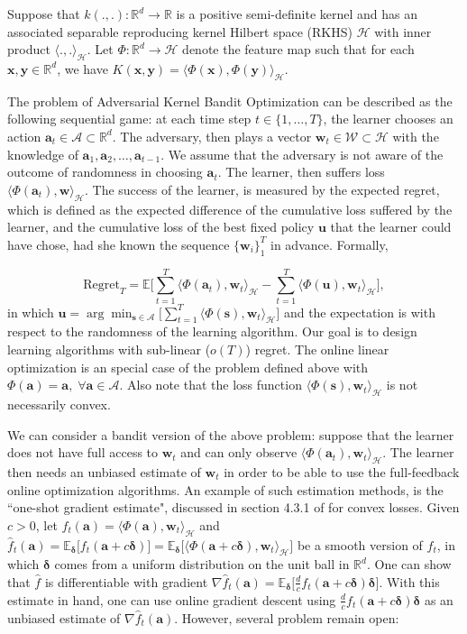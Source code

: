 \documentclass[]{article}
\newcommand{\s}{\mathbf{s}}
\newcommand{\ba}{\mathbf{a}}
\newcommand{\bw}{\mathbf{w}}
\newcommand{\cA}{\mathcal{A}}
\newcommand{\cW}{\mathcal{W}}
\newcommand{\cH}{\mathcal{H}}
\newcommand{\R}{\mathbb{R}}
\begin{document}
Suppose that $k(., .): \R^d \to \R$ is a positive semi-definite kernel and has an associated separable reproducing kernel Hilbert space (RKHS) $\cH$ with inner product $\langle ., .\rangle_\cH$. Let $\Phi: \R^d \to \cH$ denote the feature map such that for each $\mathbf{x}, \mathbf{y} \in \R^d$, we have
$K(\mathbf{x}, \mathbf{y}) = \langle \Phi(\mathbf{x}), \Phi(\mathbf{y}) \rangle_\cH $.


The problem of Adversarial Kernel Bandit Optimization can be described as the following sequential game: at each time step $t \in \{1, \dots, T\}$, the learner chooses an action $\ba_t \in \cA \subset \R^d$. The adversary, then plays a vector $\bw_t \in \cW \subset \cH$ with the knowledge of $\ba_1, \ba_2, \dots, \ba_{t-1}$. We assume that the adversary is not aware of the outcome of randomness in choosing $\ba_t$. The learner, then suffers loss $\langle \Phi(\ba_t), \bw\rangle_\cH$.  The success of the learner, is measured by the expected regret, which is defined as the expected difference of the cumulative loss suffered by the learner, and the cumulative loss of the best fixed policy $\mathbf{u}$ that the learner could have chose, had she known the sequence  $\{\bw_i\}_{1}^{T}$ in advance. Formally, 

$$\mathrm{Regret}_T = \mathbb{E}\Big[\sum_{t = 1}^{T}\langle \Phi(\ba_t), \bw_t\rangle_\cH - \sum_{t = 1}^{T}\langle \Phi(\mathbf{u}), \bw_t\rangle_\cH\Big],$$
in which $\mathbf{u} = \arg\min_{\s\in\cA} \Big[\sum_{t = 1}^{T}\langle \Phi(\s), \bw_t\rangle_\cH\Big]$ and the expectation is with respect to the randomness of the learning algorithm. Our goal is to design learning algorithms with sub-linear ($o(T)$) regret. The online linear optimization is an special case of the problem defined above with $\Phi(\ba) = \ba, \; \forall \ba \in \cA$. Also note that the loss function $\langle \Phi(\s), \bw_t\rangle_\cH$ is not necessarily convex.


We can consider a bandit version of the above problem: suppose that the learner does not have full access to $\bw_t$ and can only observe $\langle \Phi(\ba_t), \bw_t\rangle_\cH$. The learner then needs an unbiased estimate of $\bw_t$ in order to be able to use the full-feedback online optimization algorithms. An example of such estimation methods, is the ``one-shot gradient estimate", discussed in section 4.3.1 of \cite{shalev} for convex losses. Given $c>0$, let $f_t(\ba) = \langle \Phi(\ba), \bw_t\rangle_\cH$ and 
$\widehat f_t(\ba) = \mathbb{E}_{\boldsymbol{\delta}}\big[ f_t(\ba + c\boldsymbol{\delta})\big] =  \mathbb{E}_{\boldsymbol{\delta}}\big[\langle \Phi(\ba + c\boldsymbol{\delta}), \bw_t\rangle_\cH\big] $
be a smooth version of $f_t$, in which $\boldsymbol{\delta}$ comes from a uniform distribution on the unit ball in $\mathbb{R}^d$. One can show that $\widehat{f}$ is differentiable with gradient
$\nabla \widehat f_t (\ba) = \mathbb{E}_{\boldsymbol{\delta}}\big[\frac{d}{c}f_t(\ba+c\boldsymbol{\delta})\boldsymbol{\delta}\big]$. With this estimate in hand, one can use online gradient descent  using $\frac{d}{c}f_t(\ba+c\boldsymbol{\delta})\boldsymbol{\delta}$ as an unbiased estimate of $\nabla \widehat f_t (\ba)$. However, several problem remain open: 
\end{document}
